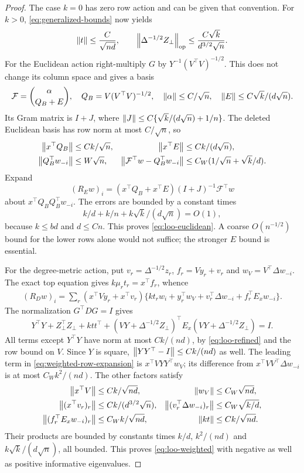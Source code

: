 \begin{proof}
The case $k=0$ has zero row action and can be given that convention.
For $k>0$, \eqref{eq:generalized-bounds} now yields
\begin{equation}\label{eq:loo-refined}
 \left\lVert t\right\rVert\le\frac C{\sqrt{nd}},\qquad
 \left\lVert\Delta^{-1/2}Z_\perp\right\rVert_{\mathrm{op}}
 \le\frac{C\sqrt k}{d^{3/2}\sqrt n}.
\end{equation}
For the Euclidean action right-multiply $G$ by
$Y^{-1}(V^\top V)^{-1/2}$. This does not change its column space and
gives a basis
\[
 \mathcal F=\binom{\alpha}{Q_B+E},\quad
 Q_B=V(V^\top V)^{-1/2},\quad
 \left\lVert\alpha\right\rVert\le C/\sqrt n,\quad
 \left\lVert E\right\rVert\le C\sqrt k/(d\sqrt n).
\]
Its Gram matrix is $I+J$, where
$\left\lVert J\right\rVert\le C\{\sqrt k/(d\sqrt n)+1/n\}$.
The deleted Euclidean basis has row norm at most $C/\sqrt n$, so
\begin{align*}
 \left\lVert x^\top Q_B\right\rVert&\le Ck/\sqrt n,&
 \left\lVert x^\top E\right\rVert&\le Ck/(d\sqrt n),\\
 \left\lVert Q_B^\top w_{-i}\right\rVert&\le W\sqrt n,&
 \left\lVert\mathcal F^\top w-Q_B^\top w_{-i}\right\rVert
 &\le C_W(1/\sqrt n+\sqrt k/d).
\end{align*}
Expand
\[
 (R_Ew)_i=(x^\top Q_B+x^\top E)(I+J)^{-1}\mathcal F^\top w
\]
about $x^\top Q_BQ_B^\top w_{-i}$.
The errors are bounded by a constant times
\begin{equation}\label{eq:loo-errors}
 k/d+k/n+k\sqrt k/(d\sqrt n)=O(1),
\end{equation}
because $k\le bd$ and $d\le Cn$. This proves
\eqref{eq:loo-euclidean}. A coarse $O(n^{-1/2})$ bound for the lower
rows alone would not suffice; the stronger $E$ bound is essential.

For the degree-metric action, put $v_r=\Delta^{-1/2}z_r$,
$f_r=Vy_r+v_r$ and $w_V=V^\top\Delta w_{-i}$.
The exact top equation gives $k\mu_rt_r=x^\top f_r$, whence
\begin{align}\label{eq:weighted-row-expansion}
 (R_Dw)_i
 =\sum_r(x^\top Vy_r+x^\top v_r)
 \{kt_rw_i+y_r^\top w_V+v_r^\top\Delta w_{-i}
                              +f_r^\top E_xw_{-i}\}.
\end{align}
The normalization $G^\top DG=I$ gives
\[
 Y^\top Y+Z_\perp^\top Z_\perp+ktt^\top
 +(VY+\Delta^{-1/2}Z_\perp)^\top E_x
            (VY+\Delta^{-1/2}Z_\perp)=I.
\]
All terms except $Y^\top Y$ have norm at most $Ck/(nd)$, by
\eqref{eq:loo-refined} and the row bound on $V$.
Since $Y$ is square, $\left\lVert YY^\top-I\right\rVert\le Ck/(nd)$ as well.
The leading term in \eqref{eq:weighted-row-expansion} is
$x^\top VYY^\top w_V$; its difference from
$x^\top VV^\top\Delta w_{-i}$ is at most $C_Wk^2/(nd)$.
The other factors satisfy
\begin{align*}
 \left\lVert x^\top V\right\rVert&\le Ck/\sqrt{nd},&
 \left\lVert w_V\right\rVert&\le C_W\sqrt{nd},\\
 \left\lVert(x^\top v_r)_r\right\rVert&\le Ck/(d^{3/2}\sqrt n),&
 \left\lVert(v_r^\top\Delta w_{-i})_r\right\rVert&\le C_W\sqrt{k/d},\\
 \left\lVert(f_r^\top E_xw_{-i})_r\right\rVert&\le C_Wk/\sqrt{nd},&
 \left\lVert kt\right\rVert&\le Ck/\sqrt{nd}.
\end{align*}
Their products are bounded by constants times
$k/d$, $k^2/(nd)$ and $k\sqrt k/(d\sqrt n)$, all bounded.
This proves \eqref{eq:loo-weighted} with negative as well as positive
informative eigenvalues.


\end{proof}

